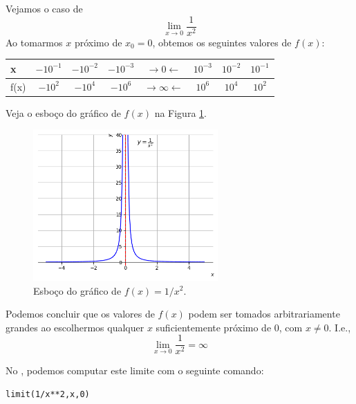 \cleardoublepage\documentclass[../main.tex]{subfiles}
\begin{document}
\begin{ex}
  Vejamos o caso de
  \begin{equation*}
    \lim_{x\to 0} \frac{1}{x^2}
  \end{equation*}
  Ao tomarmos $x$ próximo de $x_0=0$, obtemos os seguintes valores de $f(x)$:
  \begin{center}
    \begin{tabular}[H]{l|ccc|c|ccc}
      x & $-10^{-1}$ & $-10^{-2}$ & $-10^{-3}$ & $\rightarrow 0 \leftarrow$ & $10^{-3}$ & $10^{-2}$ & $10^{-1}$ \\\hline
      f(x) & $-10^{2}$ & $-10^{4}$ & $-10^{6}$ & $\rightarrow \infty \leftarrow$ & $10^{6}$ & $10^{4}$ & $10^{2}$
    \end{tabular}
  \end{center}
  Veja o esboço do gráfico de $f(x)$ na Figura \ref{fig:ex_liminf_1x2}.

\begin{figure}[H]
  \centering
  \includegraphics[width=0.63\textwidth]{fig_lim/fig_ex_liminf_1x2}
  \caption{Esboço do gráfico de $f(x)=1/x^2$.}
  \label{fig:ex_liminf_1x2}
\end{figure}  

  Podemos concluir que os valores de $f(x)$ podem ser tomados arbitrariamente grandes ao escolhermos qualquer $x$ suficientemente próximo de $0$, com $x\neq 0$. I.e.,
  \begin{equation*}
    \lim_{x\to 0}\frac{1}{x^2} = \infty
  \end{equation*}

 No \geogebra, podemos computar este limite com o seguinte comando:
\begin{verbatim}
limit(1/x**2,x,0)
\end{verbatim}
  
\end{ex}
\end{document}
